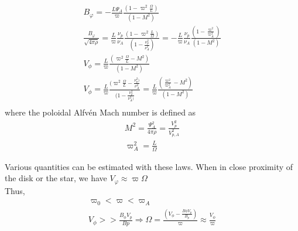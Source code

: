 \documentclass[10pt,a4paper,english]{article}
\begin{document}
\begin{align}
   B_{\varphi} = - \frac{L\Psi_{A}}{\varpi} \frac{(1-\varpi^{2} \frac{\Omega}{L})}{(1-M^{2})} \\
  \frac{B_{\varphi}}{\sqrt{4\pi\rho}} = \frac{L}{\varpi}\frac{\nu_{p}}{\nu_{A}}\frac{(1-\varpi^{2}\frac{L}{\Omega})}{(1-\frac{\nu^{2}_{p}}{\nu^{2}_{A}})} = - \frac{L}{\varpi} \frac{\nu_{p}}{\nu_{A}}\frac{(1-\frac{\varpi^{2}}{\varpi^{2}_{A}})}{(1-M^{2})} \\
  V_{\phi} = \frac{L}{\varpi} \frac{(\varpi^{2}\frac{\Omega}{L}-M^{2})}{(1-M^{2})} \\
  V_{\phi} = \frac{L}{\varpi} \frac{(\varpi^{2}\frac{\Omega}{L}-\frac{\nu^{2}_{p})}{\nu^{2}_{A}}}{(1-{\frac{\nu^{2}_{p}}{\nu^{2}_{A})}}} = \frac{L}{\varpi} \frac{(\frac{\varpi^{2}}{\varpi^{2}_{A}}-M^{2})}{(1-M^{2})} \\
\end{align}
where the poloidal Alfvén Mach number is defined as
\begin{align*}
   M^{2} = \frac{\Psi^{2}_{A}}{4\pi\rho} = \frac{V^{2}_{p}}{V^{2}_{p,A}} \\
   \varpi^{2}_{A} = \frac{L}{\Omega}
\end{align*}

Various quantities can be estimated with these laws. When in close proximity of the disk or the star, we have $V_{\varphi} \approx \varpi \Omega$
\\
Thus,
\begin{align*}
   \varpi_{0} < \varpi < \varpi_{A} \\
   V_{\phi} >> \frac{B_{\phi}V_{p}}{B{p}}  \Rightarrow  \Omega = \frac{(V_{\phi}-\frac{B{\phi}V_{p}}{B_{p}})}{\varpi} \approx \frac{V_{\phi}}{\varpi}
\end{align*}
\end{document}
